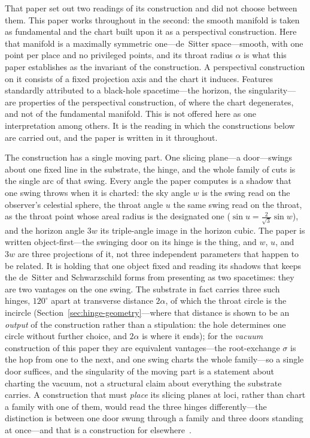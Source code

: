 \documentclass[11pt,a4paper]{article}
\theoremstyle{definition}
\begin{document}
That paper set out two readings of its construction and did not choose between them. This paper works throughout in the second: the smooth manifold is taken as fundamental and the chart built upon it as a perspectival construction. Here that manifold is a maximally symmetric one---de~Sitter space---smooth, with one point per place and no privileged points, and its throat radius $\alpha$ is what this paper establishes as the invariant of the construction. A perspectival construction on it consists of a fixed projection axis and the chart it induces. Features standardly attributed to a black-hole spacetime---the horizon, the singularity---are properties of the perspectival construction, of where the chart degenerates, and not of the fundamental manifold. This is not offered here as one interpretation among others. It is the reading in which the constructions below are carried out, and the paper is written in it throughout.

The construction has a single moving part. One slicing plane---a door---swings about one fixed line in the substrate, the hinge, and the whole family of cuts is the single arc of that swing. Every angle the paper computes is a shadow that one swing throws when it is charted: the sky angle $w$ is the swing read on the observer's celestial sphere, the throat angle $u$ the same swing read on the throat, as the throat point whose areal radius is the designated one ($\sin u=\tfrac{2}{\sqrt3}\sin w$), and the horizon angle $3w$ its triple-angle image in the horizon cubic. The paper is written object-first---the swinging door on its hinge is the thing, and $w$, $u$, and $3w$ are three projections of it, not three independent parameters that happen to be related. It is holding that one object fixed and reading its shadows that keeps the de~Sitter and Schwarzschild forms from presenting as two spacetimes: they are two vantages on the one swing. The substrate in fact carries three such hinges, $120^{\circ}$ apart at transverse distance $2\alpha$, of which the throat circle is the incircle (Section~\ref{sec:hinge-geometry}---where that distance is shown to be an \emph{output} of the construction rather than a stipulation: the hole determines one circle without further choice, and $2\alpha$ is where it ends); for the \emph{vacuum} construction of this paper they are equivalent vantages---the root-exchange $\sigma$ is the hop from one to the next, and one swing charts the whole family---so a single door suffices, and the singularity of the moving part is a statement about charting the vacuum, not a structural claim about everything the substrate carries. A construction that must \emph{place} its slicing planes at loci, rather than chart a family with one of them, would read the three hinges differently---the distinction is between one door swung through a family and three doors standing at once---and that is a construction for elsewhere~\cite{JanzenMatter}.
\end{document}
